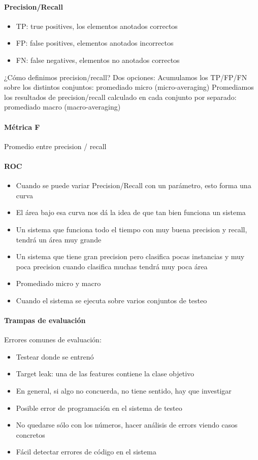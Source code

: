 \documentclass[a4paper,10pt]{article}
\begin{document}
	\paragraph {Precision/Recall}
	  \begin{itemize}	
	    \item TP: true positives, los elementos anotados correctos
	    \item FP: false positives, elementos anotados incorrectos
	    \item FN: false negatives, elementos no anotados correctos
	  \end{itemize}
	  ¿Cómo definimos precision/recall?
	  Dos opciones:
	  Acumulamos los TP/FP/FN sobre los distintos conjuntos: promediado micro (micro-averaging)
	  Promediamos los resultados de precision/recall calculado en cada conjunto por separado: promediado macro (macro-averaging)

	\paragraph {Métrica F }
	  Promedio entre precision / recall

	\paragraph {ROC}
	  \begin{itemize}
	    \item Cuando se puede variar Precision/Recall con un parámetro, esto forma una curva
	    \item El área bajo esa curva nos dá la idea de que tan bien funciona un sistema
	    \item Un sistema que funciona todo el tiempo con muy buena precision y recall, tendrá un área muy grande
	    \item Un sistema que tiene gran precision pero clasifica pocas instancias y muy poca precision cuando clasifica muchas tendrá muy poca área
	    \item Promediado micro y macro
	    \item Cuando el sistema se ejecuta sobre varios conjuntos de testeo
	  \end{itemize}

	\paragraph {Trampas de evaluación}
	  Errores comunes de evaluación:
	  \begin{itemize}
	    \item Testear donde se entrenó
	    \item Target leak: una de las features contiene la clase objetivo
	    \item En general, si algo no concuerda, no tiene sentido, hay que investigar
	    \item Posible error de programación en el sistema de testeo
	    \item No quedarse sólo con los números, hacer análisis de errors viendo casos concretos
	    \item Fácil detectar errores de código en el sistema
	  \end{itemize}
\end{document}
